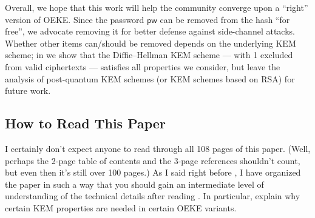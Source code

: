 \documentclass{article}
\theoremstyle{plain}
\theoremstyle{definition}
\theoremstyle{remark}
\newcommand{\pw}{\mathsf{pw}}
\begin{document}
Overall, we hope that this work will help the community converge upon a ``right'' version of OEKE. Since the password $\pw$ can be removed from the hash ``for free'', we advocate removing it for better defense against side-channel attacks. Whether other items can/should be removed depends on the underlying KEM scheme; in  we show that the Diffie--Hellman KEM scheme --- with 1 excluded from valid ciphertexts --- satisfies all properties we consider, but leave the analysis of post-quantum KEM schemes (or KEM schemes based on RSA) for future work.

\subsection{How to Read This Paper}
I certainly don't expect anyone to read through all 108 pages of this paper. (Well, perhaps the 2-page table of contents and the 3-page references shouldn't count, but even then it's still over 100 pages.) As I said right before , I have organized the paper in such a way that you should gain an intermediate level of understanding of the technical details after reading . In particular,  explain why certain KEM properties are needed in certain OEKE variants.
\end{document}
